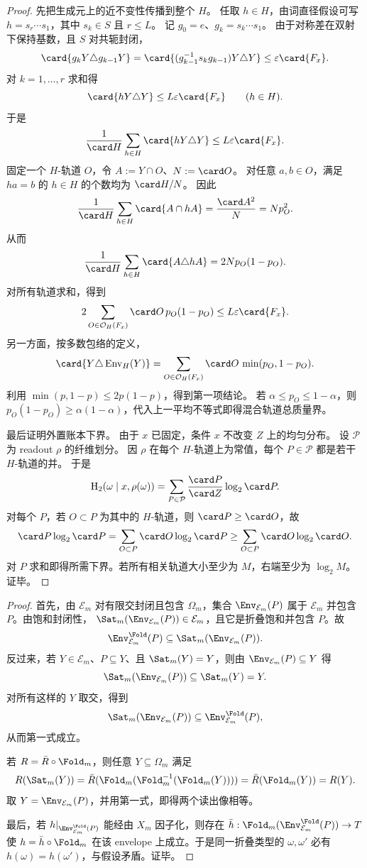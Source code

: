 \begin{proof}
先把生成元上的近不变性传播到整个 \(H\)。
任取 \(h\in H\)，由词直径假设可写 \(h=s_r\cdots s_1\)，其中 \(s_k\in S\) 且 \(r\le L\)。
记 \(g_0=e\)、\(g_k=s_k\cdots s_1\)。
由于对称差在双射下保持基数，且 \(S\) 对共轭封闭，
\[
\card{g_kY\triangle g_{k-1}Y}
=\card{(g_{k-1}^{-1}s_kg_{k-1})Y\triangle Y}
\le \varepsilon\card{F_x}.
\]
对 \(k=1,
\ldots,r\) 求和得
\[
\card{hY\triangle Y}\le L\varepsilon\card{F_x}\qquad(h\in H).
\]
于是
\[
\frac1{\card H}\sum_{h\in H}\card{hY\triangle Y}
\le L\varepsilon\card{F_x}.
\]
固定一个 \(H\)-轨道 \(O\)，令 \(A:=Y\cap O\)、\(N:=\card O\)。
对任意 \(a,b\in O\)，满足 \(h a=b\) 的 \(h\in H\) 的个数均为 \(\card H/N\)。
因此
\[
\frac1{\card H}\sum_{h\in H}\card{A\cap hA}
=\frac{\card A^2}{N}=Np_O^2.
\]
从而
\[
\frac1{\card H}\sum_{h\in H}\card{A\triangle hA}
=2Np_O(1-p_O).
\]
对所有轨道求和，得到
\[
2\sum_{O\in\mathcal O_H(F_x)}\card O\,p_O(1-p_O)
\le L\varepsilon\card{F_x}.
\]
另一方面，按多数包络的定义，
\[
\card{Y\triangle\operatorname{Env}_H(Y)}
=\sum_{O\in\mathcal O_H(F_x)}\card O\,\min(p_O,1-p_O).
\]
利用 \(\min(p,1-p)\le2p(1-p)\)，得到第一项结论。
若 \(\alpha\le p_O\le1-\alpha\)，则 \(p_O(1-p_O)\ge\alpha(1-\alpha)\)，代入上一平均不等式即得混合轨道总质量界。

最后证明外置账本下界。
由于 \(x\) 已固定，条件 \(x\) 不改变 \(Z\) 上的均匀分布。
设 \(\mathcal P\) 为 readout \(\rho\) 的纤维划分。
因 \(\rho\) 在每个 \(H\)-轨道上为常值，每个 \(P\in\mathcal P\) 都是若干 \(H\)-轨道的并。
于是
\[
\mathrm H_2(\omega\mid x,\rho(\omega))
=\sum_{P\in\mathcal P}\frac{\card P}{\card Z}\log_2\card P.
\]
对每个 \(P\)，若 \(O\subset P\) 为其中的 \(H\)-轨道，则 \(\card P\ge\card O\)，故
\[
\card P\log_2\card P
=\sum_{O\subset P}\card O\log_2\card P
\ge\sum_{O\subset P}\card O\log_2\card O.
\]
对 \(P\) 求和即得所需下界。若所有相关轨道大小至少为 \(M\)，右端至少为 \(\log_2 M\)。证毕。
\end{proof}

\begin{proof}
首先，由 \(\mathcal E_m\) 对有限交封闭且包含 \(\Omega_m\)，集合
\(\Env_{\mathcal E_m}(P)\) 属于 \(\mathcal E_m\) 并包含 \(P\)。由饱和封闭性，
\(\Sat_m(\Env_{\mathcal E_m}(P))\in\mathcal E_m\)，且它是折叠饱和并包含 \(P\)。故
\[
\Env^{\Fold}_{\mathcal E_m}(P)\subseteq \Sat_m(\Env_{\mathcal E_m}(P)).
\]
反过来，若 \(Y\in\mathcal E_m\)、\(P\subseteq Y\)、且 \(\Sat_m(Y)=Y\)，则由
\(\Env_{\mathcal E_m}(P)\subseteq Y\) 得
\[
\Sat_m(\Env_{\mathcal E_m}(P))\subseteq \Sat_m(Y)=Y.
\]
对所有这样的 \(Y\) 取交，得到
\[
\Sat_m(\Env_{\mathcal E_m}(P))\subseteq \Env^{\Fold}_{\mathcal E_m}(P),
\]
从而第一式成立。

若 \(R=\bar R\circ\Fold_m\)，则任意 \(Y\subseteq\Omega_m\) 满足
\[
R(\Sat_m(Y))=\bar R(\Fold_m(\Fold_m^{-1}(\Fold_m(Y))))=\bar R(\Fold_m(Y))=R(Y).
\]
取 \(Y=\Env_{\mathcal E_m}(P)\)，并用第一式，即得两个读出像相等。

最后，若 \(h|_{\Env^{\Fold}_{\mathcal E_m}(P)}\) 能经由 \(X_m\) 因子化，则存在
\(\bar h:\Fold_m(\Env^{\Fold}_{\mathcal E_m}(P))\to T\) 使
\(h=\bar h\circ\Fold_m\) 在该 envelope 上成立。于是同一折叠类型的 \(\omega,\omega'\) 必有
\(h(\omega)=h(\omega')\)，与假设矛盾。证毕。
\end{proof}

